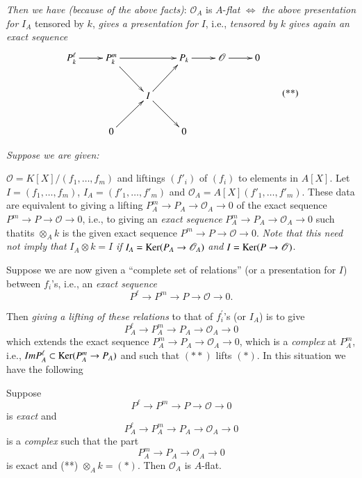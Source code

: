 {{\em Then we have (because of the above facts)}: $\mathscr{O}_A$ is $A$-{\em flat} $\Leftrightarrow$ {\em the above presentation for} $I_{A}$ tensored by $k$, {\em gives a presentation for} $I$, i.e., {\em tensored by} $k$ {\em gives again an exact sequence}
\begin{equation*}
\vcenter{
\xymatrix{
P_k^\ell\ar[r] & P^{m}_{k}\ar[rr]\ar[dr] & & P_k \ar[r] & \mathscr{O}\ar[r] &0\\
& & I \ar[ur]\ar[dr] & & &\\
& 0\ar[ur] & & 0  &  &}}\tag{**}
\end{equation*}

{\em Suppose we are given:}

$\mathscr{O}=K[X]/(f_1,\ldots,f_m)$ and liftings $(f'_i)$ of $(f_i)$ to elements in $A[X]$. Let $I=(f_1,\ldots,f_m)$, $I_A=(f'_1,\ldots,f'_m)$ and $\mathscr{O}_A=A[X] (f'_1,\dots,f'_m)$. These data are equivalent to giving a lifting $P_A^m\rightarrow P_A\rightarrow \mathscr{O}_A\rightarrow 0$ of the exact sequence $P^m\rightarrow P\rightarrow \mathscr{O}\rightarrow 0$, i.e., to giving an {\em exact sequence} $P_A^m\rightarrow P_A \rightarrow \mathscr{O}_A\rightarrow 0$ such that\pageoriginale its $\otimes_A k$  is the given exact sequence $P^{m}\rightarrow P\rightarrow\mathscr{O}\rightarrow 0$. {\em Note that this need not imply that} $I_A \otimes k=I$ {\em if} $I_A=\operatorname{Ker}(P_A\rightarrow \mathscr{O}_A)$ {\em and} $I=\operatorname{Ker}(P\rightarrow \mathscr{O})$.

Suppose we are now given a ``complete set of relations'' (or a presentation for $I$) between $f_i$'s, i.e., an {\em exact  sequence}
\begin{equation*}
P^{\ell}\rightarrow P^{m}\rightarrow P \rightarrow \mathscr{O}\rightarrow 0.\tag{*}
\end{equation*}

Then {\em giving a lifting of these relations} to that of $f_{i}^{'}$'s (or $I_A$) is to give
\begin{equation*}
P_A^{\ell}\rightarrow P_A^{m}\rightarrow P_A \rightarrow \mathscr{O}_A\rightarrow 0\tag{**}
\end{equation*}
which extends the exact sequence $P_A^{m}\rightarrow P_A\rightarrow \mathscr{O}_A\rightarrow 0$, which is a {\em complex} at $P_A^{m}$, i.e., $Im P_A^{\ell}\subset \operatorname{Ker}(P_A^{m}\rightarrow P_A)$ and such that $(**)$ lifts $(*)$. In this situation we have the following 

\begin{proposition}\label{part1-prop3.1}%
Suppose
\begin{equation*}
P^{\ell}\rightarrow P^{m}\rightarrow P \rightarrow \mathscr{O}\rightarrow 0\tag{*}
\end{equation*}
is {\em exact} and
\begin{equation*}
P_A^{\ell}\rightarrow P_A^{m}\rightarrow P_A \rightarrow \mathscr{O}_A\rightarrow 0\tag{**}
\end{equation*}
is a {\em complex} such that the part
$$
P_A^{m}\rightarrow P_A \rightarrow \mathscr{O}_A\rightarrow 0
$$
is exact and (**) $\otimes_A k=(*)$. Then $\mathscr{O}_A$ is $A$-flat.
\end{proposition}

}
